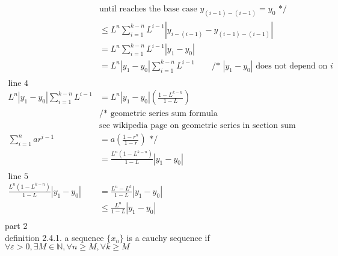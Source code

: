\documentclass[12pt, border = 4pt, multi]{article} %
\begin{document}
\begin{align*}
&\text{until reaches the base case $y_{(i - 1) - (i - 1)} = y_0$ */}\\
&\leq L ^ n \sum_{i = 1} ^ {k - n} L ^ {i - 1}\left|y_{i - (i - 1)} - y_{(i - 1) - (i - 1)}\right|\\
&= L ^ n \sum_{i = 1} ^ {k - n} L ^ {i - 1}|y_1 - y_0|\\
&= L ^ n |y_1 - y_0| \sum_{i = 1} ^ {k - n} L ^ {i - 1} \qquad \text{/* $|y_1 - y_0|$ does not depend on $i$}\\
\\
\text{line 4}\\
L ^ n |y_1 - y_0| \sum_{i = 1} ^ {k - n} L ^ {i - 1} &= L ^ n |y_1 - y_0|\left(\frac{1 - L ^ {k - n}}{1 - L}\right)\\
&\text{/* geometric series sum formula}\\
&\text{see wikipedia page on geometric series in section sum closed formula}\\
\sum_{i = 1} ^ n a r ^ {i - 1} &= a\left(\frac{1 - r ^ n}{1 - r}\right) \text{ */}\\
&= \frac{L ^ n(1 - L ^ {k - n})}{1 - L}|y_1 - y_0|\\
\\
\text{line 5}\\
\frac{L ^ n(1 - L ^ {k - n})}{1 - L}|y_1 - y_0| &= \frac{L ^ n - L ^ k}{1 - L}|y_1 - y_0|\\
&\leq \frac{L ^ n}{1 - L}|y_1 - y_0|\\
\end{align*}
part 2\\
definition 2.4.1. a sequence $\{x_n\}$ is a cauchy sequence if $\forall \varepsilon > 0, \exists M \in \mathbb{N}, \forall n \geq M, \forall k \geq M$
\end{document}
